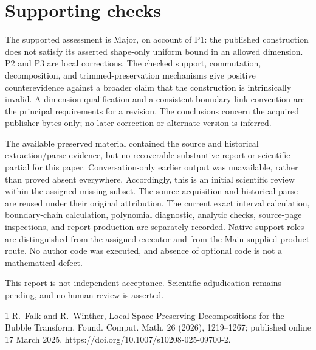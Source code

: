 \documentclass[10pt]{article}
\begin{document}
\section*{Supporting checks}
The supported assessment is Major, on account of P1: the published construction does not satisfy its asserted shape-only uniform bound in an allowed dimension. P2 and P3 are local corrections. The checked support, commutation, decomposition, and trimmed-preservation mechanisms give positive counterevidence against a broader claim that the construction is intrinsically invalid. A dimension qualification and a consistent boundary-link convention are the principal requirements for a revision. The conclusions concern the acquired publisher bytes only; no later correction or alternate version is inferred.\par
The available preserved material contained the source and historical extraction/parse evidence, but no recoverable substantive report or scientific partial for this paper. Conversation-only earlier output was unavailable, rather than proved absent everywhere. Accordingly, this is an initial scientific review within the assigned missing subset. The source acquisition and historical parse are reused under their original attribution. The current exact interval calculation, boundary-chain calculation, polynomial diagnostic, analytic checks, source-page inspections, and report production are separately recorded. Native support roles are distinguished from the assigned executor and from the Main-supplied product route. No author code was executed, and absence of optional code is not a mathematical defect.\par
This report is not independent acceptance. Scientific adjudication remains pending, and no human review is asserted.\par
1 R. Falk and R. Winther, Local Space-Preserving Decompositions for the Bubble Transform, Found. Comput. Math. 26 (2026), 1219–1267; published online 17 March 2025. https://doi.org/10.1007/s10208-025-09700-2.\par
\end{document}
